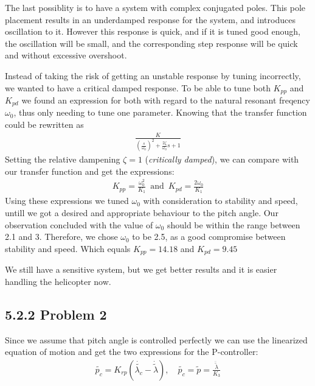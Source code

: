 The last possiblity is to have a system with complex conjugated poles. This pole placement results in an underdamped response for the system, and introduces oscillation to it. However this response is quick, and if it is tuned good enough, the oscillation will be small, and the corresponding step response will be quick and without excessive overshoot.

Instead of taking the risk of getting an unstable response by tuning incorrectly, we wanted to have a critical damped response. To be able to tune both $K_{pp}$ and $K_{pd}$ we found an expression for both with regard to the natural resonant freqency $\omega_0$, thus only needing to tune one parameter. Knowing that the transfer function could be rewritten as 
\begin{align*}
    \frac{K}{(\frac{s}{\omega_0})^2+\frac{2\zeta}{\omega_0}s +1}
\end{align*} 
Setting the relative dampening $\zeta = 1$ (\textit{critically damped}), we can compare with our transfer function and get the expressions:
\begin{align*}
    K_{pp} = \frac{\omega_0^2}{K_1}\enspace \text{and}\enspace K_{pd} = \frac{2\omega_0}{K_1}
\end{align*}
Using these expressions we tuned $\omega_0$ with consideration to stability and speed, untill we got a desired and appropriate behaviour to the pitch angle. Our observation concluded with the value of $\omega_0$ should be within the range between 2.1 and 3. Therefore, we chose $\omega_0$ to be 2.5, as a good compromise between stability and speed. Which equals $K_{pp} = 14.18$ and $K_{pd} = 9.45$

We still have a sensitive system, but we get better results and it is easier handling the helicopter now. 


\newpage
{}
\subsection*{5.2.2 Problem 2}
Since we assume that pitch angle is controlled perfectly we can use the linearized equation of motion and get the two expressions for the P-controller:
\begin{align*}
    \tilde{p_c} = K_{rp}(\dot{\tilde{\lambda_c}} - \dot{\tilde{\lambda}}),\quad \tilde{p_c} = \tilde{p} = \frac{\ddot{\tilde{\lambda}}}{K_3}
\end{align*}


